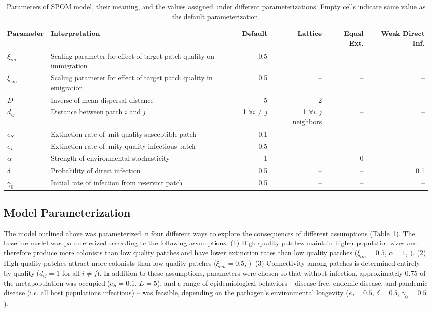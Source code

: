 \documentclass{svjour3}
\begin{document}
\begin{table}[h!]   
\caption{Parameters of SPOM model, their meaning, and the values assigned under different parameterizations.  Empty cells indicate same value as the default parameterization.}
\begin{tabular}{l p{5cm} rrrr}
Parameter & Interpretation &  Default & Lattice & Equal Ext. & Weak Direct Inf.\\
\hline
$\xi_{im}$ & Scaling parameter for effect of target patch quality on immigration & 0.5 & -- & -- & --\\
$\xi_{em}$ & Scaling parameter for effect of target patch quality in emigration & 0.5 & -- & -- & --\\
$D$& Inverse of mean dispersal distance & 5 & 2 & -- & --\\
$d_{ij}$ & Distance between patch $i$ and $j$ & 1 $\forall i \neq j$ & 1 $\forall i, j$ neighbors & -- & --\\
\hline
$e_S$ & Extinction rate of unit quality susceptible patch & 0.1 & -- & -- & --\\
$e_I$ & Extinction rate of unity quality infectious patch & 0.5 & -- & -- & --\\
$\alpha$ & Strength of environmental stochasticity & 1 & -- & 0 & --\\
\hline
$\delta$ & Probability of direct infection & 0.5 & -- & -- & 0.1\\
$\gamma_0$ & Initial rate of infection from reservoir patch & 0.5 & -- & -- & --
\end{tabular}
\label{params}
\end{table}

\subsection{Model Parameterization}

The model outlined above was parameterized in four different ways to explore the consequences of different assumptions (Table~\ref{params}).  The baseline model was parameterized  according to the following assumptions. (1) High quality patches maintain higher population sizes and therefore produce more colonists than low quality patches and have lower extinction rates than low quality patches ($\xi_{im}=0.5$, $\alpha=1$, \cite{Hanski2003}).  (2) High quality patches attract more colonists than low quality patches ($\xi_{em}=0.5$, \cite{Hanski2003}).  (3)  Connectivity among patches is determined entirely by quality ($d_{ij}=1$ for all $i \neq j$).  In addition to these assumptions, parameters were chosen so that without infection, approximately 0.75 of the metapopulation was occupied ($e_S = 0.1$, $D=5$), and a range of epidemiological behaviors -- disease-free, endemic disease, and pandemic disease (i.e. all host populations infectious) -- was feasible, depending on the pathogen's environmental longevity ($e_I = 0.5$, $\delta = 0.5$, $\gamma_0 = 0.5$). 
\end{document}
